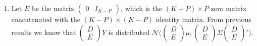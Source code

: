\documentclass{article}[12pt]
\begin{document}
\begin{enumerate}
		\item Let $E$ be the matrix $\begin{pmatrix} 0 & I_{K-P} \end{pmatrix}$, which is the $(K-P) \times P$ zero matrix concatenated with the $(K-P) \times (K-P)$ identity matrix. From previous results we know that $\begin{pmatrix} D \\ E \end{pmatrix} Y$ is distributed $\mathscr{N} \bigg( \begin{pmatrix} D \\ E \end{pmatrix} \mu, \begin{pmatrix} D \\ E \end{pmatrix} \Sigma \begin{pmatrix} D \\ E \end{pmatrix}' \bigg)$.


\end{enumerate}
\end{document}
